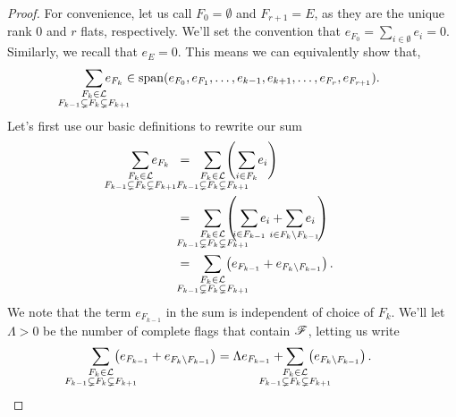 \documentclass[12pt,oneside]{../../sfsuthesis}
\begin{document}
\begin{proof}
    For convenience, let us call \( F_0 = \emptyset \) and \( F_{r+1} = E \), as they are the unique rank 0 and \( r \) flats, respectively.
    We'll set the convention that \( e_{F_0} = \sum_{i \in \emptyset} e_i = 0 \).
    Similarly, we recall that \( e_E = 0 \).
    This means we can equivalently show that,
    \[
        \sum_{\mathclap{\substack{F_k \in \cL \\ F_{k-1} \subsetneq F_k \subsetneq F_{k+1} }}} e_{F_{k}} \in \Span( e_{F_0}, e_{F_1}, \dots, e_{k-1}, e_{k+1}, \dots, e_{F_r}, e_{F_{r+1}} ).
    \]
    Let's first use our basic definitions to rewrite our sum
    \begin{align*}
        \sum_{\mathclap{\substack{F_k \in \cL \\ F_{k-1} \subsetneq F_k \subsetneq F_{k+1} }}} e_{F_{k}}
        \;\; & = \;\;\;
        \sum_{\mathclap{\substack{F_k \in \cL \\ F_{k-1} \subsetneq F_k \subsetneq F_{k+1} }}}\, \left( \, \sum_{\mathclap{ i \in F_k }}e_i \right) \\
             & = \;\;\;
        \sum_{\mathclap{\substack{F_k \in \cL \\ F_{k-1} \subsetneq F_k \subsetneq F_{k+1} }}}\, \left( \; \sum_{\mathclap{ i \in F_{k-1} }}e_i + \sum_{\mathclap{ i \in F_{k} \setminus F_{k-1} }}e_i \, \right) \\
             & = \;\;\;
        \sum_{\mathclap{\substack{F_k \in \cL \\ F_{k-1} \subsetneq F_k \subsetneq F_{k+1} }}}\, \left( e_{F_{k-1}} + e_{F_k \setminus F_{k-1}} \right).
    \end{align*}
    We note that the term \( e_{F_{k-1}}\) in the sum is independent of choice of \( F_k \).
    We'll let \( \Lambda > 0 \) be the number of complete flags that contain \( \mathscr{F} \), letting us write
    \[
        \sum_{\mathclap{\substack{F_k \in \cL \\ F_{k-1} \subsetneq F_k \subsetneq F_{k+1} }}}\, \left( e_{F_{k-1}} + e_{F_k \setminus F_{k-1}} \right)
        = \Lambda e_{F_{k-1}} + \sum_{\mathclap{\substack{F_k \in \cL \\ F_{k-1} \subsetneq F_k \subsetneq F_{k+1} }}}\, \left( e_{F_k \setminus F_{k-1}} \right).
    \]


\end{proof}
\end{document}
